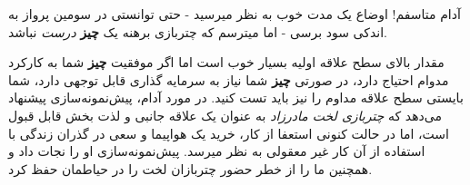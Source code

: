 آدام متاسفم! اوضاع یک مدت خوب به نظر میرسید - حتی توانستی در سومین پرواز
به اندکی سود برسی - اما میترسم که چتربازی برهنه یک \textbf{چیز}
\emph{درست} نباشد.

مقدار بالای سطح علاقه اولیه بسیار خوب است اما اگر موفقیت \textbf{چیز}
شما به کارکرد مدوام احتیاج دارد، در صورتی \textbf{چیز} شما نیاز به
سرمایه گذاری قابل توجهی دارد، شما بایستی سطح علاقه مداوم را نیز باید تست
کنید. در مورد آدام، پیش‌نمونه‌سازی پیشنهاد می‌دهد که \emph{چتربازی لخت
مادرزاد} به عنوان یک علاقه جانبی و لذت بخش قابل قبول است، اما در حالت
کنونی استعفا از کار، خرید یک هواپیما و سعی در گذران زندگی با استفاده از
آن کار غیر معقولی به نظر میرسد. پیش‌نمونه‌سازی او را نجات داد و همچنین
ما را از خطر حضور چتربازان لخت را در حیاطمان حفظ کرد.
